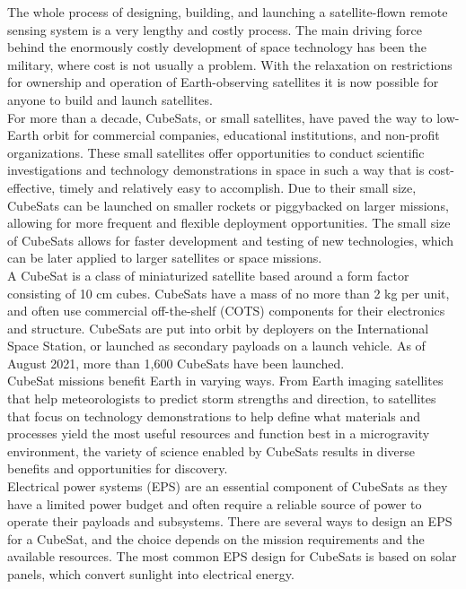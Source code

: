 The whole process of designing, building, and launching a satellite-flown remote sensing system is a very lengthy and costly process. The main driving force behind the enormously costly development
of space technology has been the military, where cost is not usually a problem. With the relaxation on restrictions for ownership and operation of Earth-observing satellites it is now possible for anyone to build and launch satellites.
\\

For more than a decade, CubeSats, or small satellites, have paved the way to
low-Earth orbit for commercial companies, educational institutions, and non-profit
organizations. These small satellites offer opportunities to conduct scientific
investigations and technology demonstrations in space in such a way that is
cost-effective, timely and relatively easy to accomplish. Due to their small size, CubeSats can be launched on smaller rockets or piggybacked on larger missions, allowing for more frequent and flexible deployment opportunities. The small size of CubeSats allows for faster development and testing of new technologies, which can be later applied to larger satellites or space missions.\\


A CubeSat is a class of miniaturized satellite based around a form factor consisting
of 10 cm cubes. CubeSats have a mass of no more than 2 kg per unit, and often use
commercial off-the-shelf (COTS) components for their electronics and structure.
CubeSats are put into orbit by deployers on the International Space Station, or
launched as secondary payloads on a launch vehicle. As of August 2021, more than
1,600 CubeSats have been launched.
\\

CubeSat missions benefit Earth in varying ways. From Earth imaging satellites that
help meteorologists to predict storm strengths and direction, to satellites that focus
on technology demonstrations to help define what materials and processes yield the
most useful resources and function best in a microgravity environment, the variety
of science enabled by CubeSats results in diverse benefits and opportunities for
discovery.\\

Electrical power systems (EPS) are an essential component of CubeSats as they have a limited power budget and often require a reliable source of power to operate their payloads and subsystems. There are several ways to design an EPS for a CubeSat, and the choice depends on the mission requirements and the available resources.
The most common EPS design for CubeSats is based on solar panels, which convert sunlight into electrical energy. 

